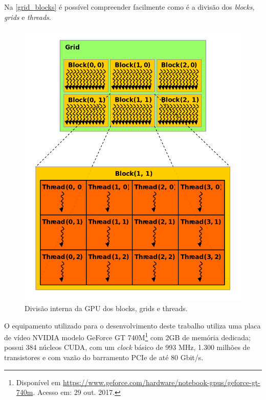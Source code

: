 \documentclass[
	12pt,				%
	twoside,			%
	a4paper,			%
	english,			%
	french,				%
	spanish,			%
	brazil				%
	]{abntex2}
\begin{document}
Na \autoref{grid_blocks} é possível compreender facilmente como é a
divisão dos \emph{blocks}, \emph{grids} e \emph{threads}.

\begin{figure}[!ht]
    \caption{\label{grid_blocks} Divisão interna da GPU dos blocks, grids e threads.}
    \begin{center}
        \includegraphics[scale=0.36]{imagens/block-grid.jpg}
    \end{center}
\end{figure}

O equipamento utilizado para o desenvolvimento deste trabalho utiliza
uma placa de vídeo NVIDIA modelo GeForce GT 740M\footnote{Disponível em
  \url{https://www.geforce.com/hardware/notebook-gpus/geforce-gt-740m}.
  Acesso em: 29 out. 2017.} com 2GB de memória dedicada; possui 384
núcleos CUDA, com um \emph{clock} básico de 993 MHz, 1.300 milhões de
transistores e com vazão do barramento PCIe de até 80 Gbit/s.
\end{document}
